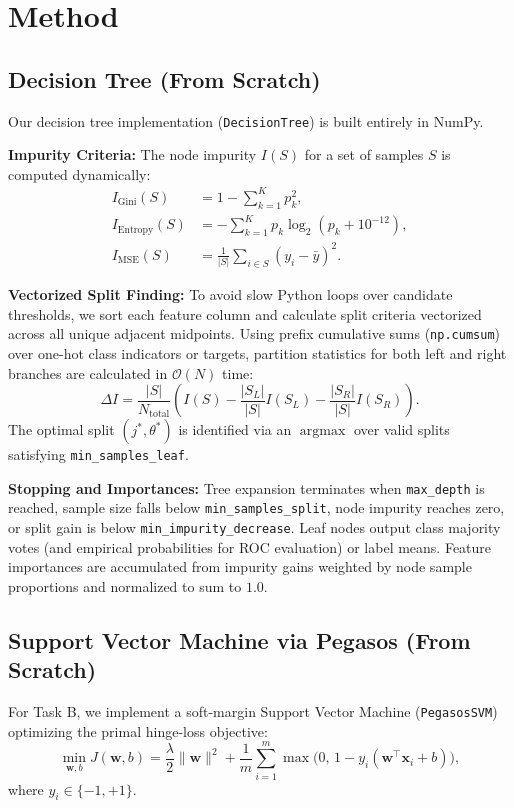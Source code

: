 \documentclass[10pt,twocolumn,a4paper]{article}
\begin{document}
\section{Method}
\subsection{Decision Tree (From Scratch)}
Our decision tree implementation (\texttt{DecisionTree}) is built entirely in NumPy.

\textbf{Impurity Criteria:} The node impurity $I(S)$ for a set of samples $S$ is computed dynamically:
\begin{align}
  I_{\text{Gini}}(S) &= 1 - \sum_{k=1}^K p_k^2, \\
  I_{\text{Entropy}}(S) &= -\sum_{k=1}^K p_k \log_2(p_k + 10^{-12}), \\
  I_{\text{MSE}}(S) &= \frac{1}{|S|}\sum_{i \in S} (y_i - \bar{y})^2.
\end{align}

\textbf{Vectorized Split Finding:} To avoid slow Python loops over candidate thresholds, we sort each feature column and calculate split criteria vectorized across all unique adjacent midpoints. Using prefix cumulative sums (\texttt{np.cumsum}) over one-hot class indicators or targets, partition statistics for both left and right branches are calculated in $\mathcal{O}(N)$ time:
\begin{equation}
  \Delta I = \frac{|S|}{N_{\text{total}}} \left( I(S) - \frac{|S_L|}{|S|} I(S_L) - \frac{|S_R|}{|S|} I(S_R) \right).
\end{equation}
The optimal split $(j^*, \theta^*)$ is identified via an $\operatorname{argmax}$ over valid splits satisfying \texttt{min\_samples\_leaf}.

\textbf{Stopping and Importances:} Tree expansion terminates when \texttt{max\_depth} is reached, sample size falls below \texttt{min\_samples\_split}, node impurity reaches zero, or split gain is below \texttt{min\_impurity\_decrease}. Leaf nodes output class majority votes (and empirical probabilities for ROC evaluation) or label means. Feature importances are accumulated from impurity gains weighted by node sample proportions and normalized to sum to $1.0$.

\subsection{Support Vector Machine via Pegasos (From Scratch)}
For Task B, we implement a soft-margin Support Vector Machine (\texttt{PegasosSVM}) optimizing the primal hinge-loss objective:
\begin{equation}
  \min_{\mathbf{w}, b} J(\mathbf{w}, b) = \frac{\lambda}{2} \|\mathbf{w}\|^2 + \frac{1}{m} \sum_{i=1}^m \max\big(0,\, 1 - y_i(\mathbf{w}^\top \mathbf{x}_i + b)\big),
\end{equation}
where $y_i \in \{-1, +1\}$.
\end{document}
